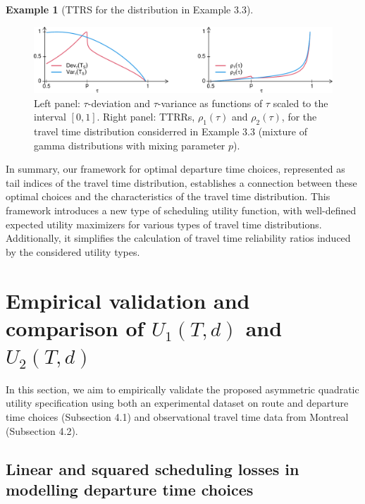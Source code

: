 \documentclass[preprint, 3p, authoryear]{elsarticle} %
\theoremstyle{definition}
\theoremstyle{definition}
\newtheorem{example}{Example}[section]
\theoremstyle{definition}
\theoremstyle{definition}
\theoremstyle{remark}
\begin{document}
\begin{example}[TTRS for the distribution in Example 3.3]
\begin{figure}
\includegraphics[width=1\linewidth]{traffic-expectiles_files/figure-latex/figrho-1} \caption{Left panel: $\tau$-deviation and $\tau$-variance as functions of $\tau$ scaled to the interval $[0,1]$. Right panel: TTRRs, $\rho_1(\tau)$ and $\rho_2(\tau)$, for the travel time distribution considerred in Example 3.3 (mixture of gamma distributions with mixing parameter $p$).}\label{fig:figrho}
\end{figure}

\end{example}

In summary, our framework for optimal departure time choices, represented as tail indices of the travel time distribution, establishes a connection between these optimal choices and the characteristics of the travel time distribution. This framework introduces a new type of scheduling utility function, with well-defined expected utility maximizers for various types of travel time distributions. Additionally, it simplifies the calculation of travel time reliability ratios induced by the considered utility types.

\hypertarget{empirical-validation-and-comparison-of-u_1td-and-u_2td}{%
\section{\texorpdfstring{Empirical validation and comparison of \(U_1(T,d)\) and \(U_2(T,d)\)}{Empirical validation and comparison of U\_1(T,d) and U\_2(T,d)}}\label{empirical-validation-and-comparison-of-u_1td-and-u_2td}}

In this section, we aim to empirically validate the proposed asymmetric quadratic utility specification using both an experimental dataset on route and departure time choices (Subsection 4.1) and observational travel time data from Montreal (Subsection 4.2).

\hypertarget{linear-and-squared-scheduling-losses-in-modelling-departure-time-choices}{%
\subsection{Linear and squared scheduling losses in modelling departure time choices}\label{linear-and-squared-scheduling-losses-in-modelling-departure-time-choices}}
\end{document}
